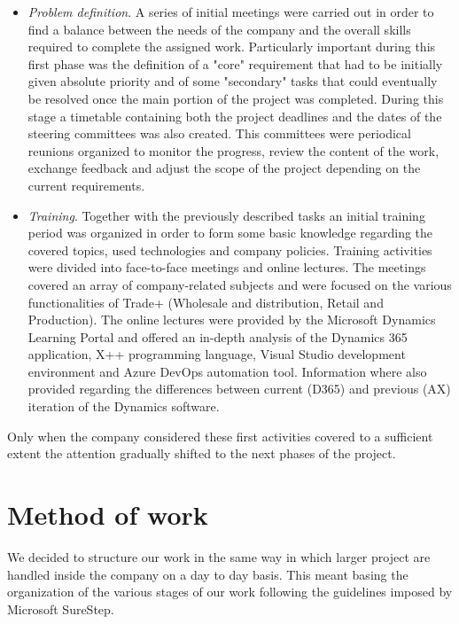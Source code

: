 \begin{itemize}
    \item \textit{Problem definition}. A series of initial meetings were carried out in order to find a balance between the needs of the company and the overall skills required to complete the assigned work. Particularly important during this first phase was the definition of a "core" requirement that had to be initially given absolute priority and of some "secondary" tasks that could eventually be resolved once the main portion of the project was completed. During this stage a timetable containing both the project deadlines and the dates of the steering committees was also created. This committees were periodical reunions organized to monitor the progress, review the content of the work, exchange feedback and adjust the scope of the project depending on the current requirements.
    
    \item \textit{Training}. Together with the previously described tasks an initial training period was organized in order to form some basic knowledge regarding the covered topics, used technologies and company policies. Training activities were divided into face-to-face meetings and online lectures. The meetings covered an array of company-related subjects and were focused on the various functionalities of Trade+ (Wholesale and distribution, Retail and Production). The online lectures were provided by the Microsoft Dynamics Learning Portal and offered an in-depth analysis of the Dynamics 365 application, X++ programming language, Visual Studio development environment and Azure DevOps automation tool. Information where also provided regarding the differences between current (D365) and previous (AX) iteration of the Dynamics software.
\end{itemize}

Only when the company considered these first activities covered to a sufficient extent the attention gradually shifted to the next phases of the project.

\section{Method of work}

We decided to structure our work in the same way in which larger project are handled inside the company on a day to day basis. This meant basing the organization of the various stages of our work following the guidelines imposed by Microsoft SureStep.

